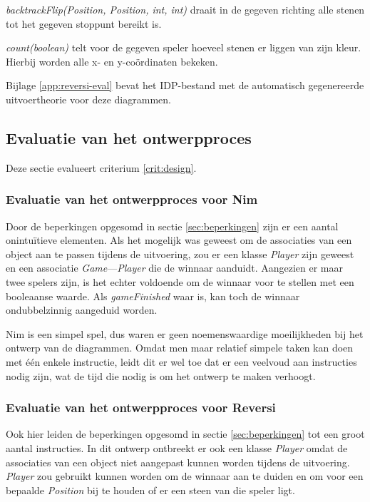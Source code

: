 \textit{backtrackFlip(Position, Position, int, int)} draait in de gegeven richting alle stenen tot het gegeven stoppunt bereikt is.

\textit{count(boolean)} telt voor de gegeven speler hoeveel stenen er liggen van zijn kleur. Hierbij worden alle x- en y-co\"ordinaten bekeken.

Bijlage \ref{app:reversi-eval} bevat het IDP-bestand met de automatisch gegenereerde uitvoertheorie voor deze diagrammen.

\subsection{Evaluatie van het ontwerpproces}

Deze sectie evalueert criterium \ref{crit:design}.

\subsubsection{Evaluatie van het ontwerpproces voor Nim}

Door de beperkingen opgesomd in sectie \ref{sec:beperkingen} zijn er een aantal onintu\"itieve elementen. Als het mogelijk was geweest om de associaties van een object aan te passen tijdens de uitvoering, zou er een klasse \textit{Player} zijn geweest en een associatie \textit{Game}---\textit{Player} die de winnaar aanduidt. Aangezien er maar twee spelers zijn, is het echter voldoende om de winnaar voor te stellen met een booleaanse waarde. Als \textit{gameFinished} waar is, kan toch de winnaar ondubbelzinnig aangeduid worden.

Nim is een simpel spel, dus waren er geen noemenswaardige moeilijkheden bij het ontwerp van de diagrammen. Omdat men maar relatief simpele taken kan doen met \'e\'en enkele instructie, leidt dit er wel toe dat er een veelvoud aan instructies nodig zijn, wat de tijd die nodig is om het ontwerp te maken verhoogt.

\subsubsection{Evaluatie van het ontwerpproces voor Reversi}

Ook hier leiden de beperkingen opgesomd in sectie \ref{sec:beperkingen} tot een groot aantal instructies. In dit ontwerp ontbreekt er ook een klasse \textit{Player} omdat de associaties van een object niet aangepast kunnen worden tijdens de uitvoering. \textit{Player} zou gebruikt kunnen worden om de winnaar aan te duiden en om voor een bepaalde \textit{Position} bij te houden of er een steen van die speler ligt.

